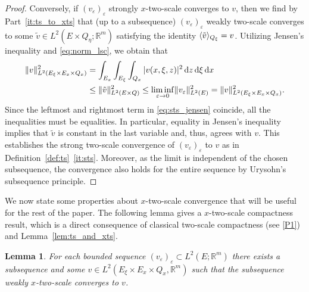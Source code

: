 \documentclass[reqno,11pt]{amsart}
\numberwithin{equation}{section}
\theoremstyle{thmlemcorr}
\numberwithin{theorem}{section}
\newtheorem{lemma}[theorem]{Lemma}
\theoremstyle{thmlemcorr*}
\theoremstyle{defi}
\theoremstyle{remexample}
\theoremstyle{ass}
\newcommand{\R}{\mathbb{R}}
\renewcommand{\epsilon}{\varepsilon}
\DeclarePairedDelimiter{\norm}{\lVert}{\rVert}
\DeclarePairedDelimiter{\inner}{\langle}{\rangle}
\newcommand{\1}{\mathds{1}}
\newcommand{\veps}{\varepsilon}
\newcommand{\dl}{\,\mathrm{d}}
\newcommand{\sequence}[2]{(#1_#2)_{#2}}
\begin{document}
\begin{proof}
    Conversely, if \(\sequence{v}{\veps}\) strongly \(x\)-two-scale converges to \(v\), then we find by Part~\ref{it:ts_to_xts} that (up to a subsequence) $(v_\epsilon)_\epsilon$ weakly two-scale converges to some $\tilde{v} \in L^2(E\times Q_\eta;\R^m)$ satisfying the identity \(\inner{\tilde{v}}_{Q_\xi}=v\). Utilizing Jensen's inequality and \eqref{eq:norm_lsc}, we obtain that
    \begin{align}
    \begin{split}\label{eq:sts_jensen}
         \norm{v}_{L^2(E_\xi\times E_x\times Q_x)}^2
        &= \int_{E_x}\int_{E_\xi}\int_{Q_x} |v(x,\xi,z)|^2\dl z\dl \xi\dl x\\
        &\le \norm{\tilde{v}}_{L^2(E\times Q)}^2
        \le \liminf_{\veps \to 0} \norm{v_\veps}_{L^2(E)}^2
        = \norm{v}_{L^2(E_\xi\times E_x\times Q_x)}^2.
    \end{split}
    \end{align}
    Since the leftmost and rightmost term in \eqref{eq:sts_jensen} coincide, all the inequalities must be equalities. In particular, equality in Jensen's inequality implies that $\tilde{v}$ is constant in the last variable and, thus, agrees with $v$. This establishes the strong two-scale convergence of $(v_\epsilon)_\epsilon$ to $v$ as in Definition~\ref{def:ts}~\ref{it:sts}. Moreover, as the limit is independent of the chosen subsequence, the convergence also holds for the entire sequence by Urysohn's subsequence principle.
\end{proof}

We now state some properties about $x$-two-scale convergence that will be useful for the rest of the paper.
The following lemma gives a \(x\)-two-scale compactness result, which is a direct consequence of classical two-scale compactness (see \ref{P1}) and Lemma~\ref{lem:ts_and_xts}.
\begin{lemma}\label{lem:xts_comp}
    For each bounded sequence \(\sequence{v}{\veps}\subset L^2(E;\R^m)\) there exists a subsequence and some \(v\in L^2(E_\xi\times E_x\times Q_x,\R^m)\) such that the subsequence weakly \(x\)-two-scale converges to \(v\).
\end{lemma}
\end{document}
